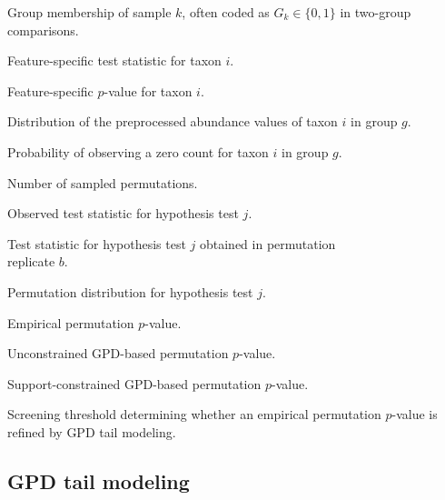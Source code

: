\notationsettings{3.2cm}
\begin{notationlist}
	\item[$G_k$] Group membership of sample $k$, often coded as $G_k \in \{0,1\}$ in two-group comparisons.
	
	\item[$T_i$] Feature-specific test statistic for taxon $i$.
	
	\item[$p_i$] Feature-specific $p$-value for taxon $i$.
	
	\item[$F_i^{(g)}$] Distribution of the preprocessed abundance values of taxon $i$ in group $g$.
	
	\item[$\pi_i^{(g)}$] Probability of observing a zero count for taxon $i$ in group $g$.
	
	\item[$B$] Number of sampled permutations.
	
	\item[$T_{\mathrm{obs}}^{(j)}$] Observed test statistic for hypothesis test $j$.
	
	\item[$T_b^{*(j)}$] Test statistic for hypothesis test $j$ obtained in permutation\\ replicate $b$.
	
	\item[$\mathcal{T}^{(j)} = \{T_b^{*(j)}\}_{b=1}^{B}$] Permutation distribution for hypothesis test $j$.
	
	\item[$p_{\mathrm{emp}}$] Empirical permutation $p$-value.
	
	\item[$p_{\mathrm{GPD}}$] Unconstrained GPD-based permutation $p$-value.
	
	\item[$p_{\mathrm{cGPD}}$] Support-constrained GPD-based permutation $p$-value.
	
	\item[$p_{\mathrm{thr}}$] Screening threshold determining whether an empirical permutation $p$-value is refined by GPD tail modeling.
\end{notationlist}

\subsection*{GPD tail modeling}

